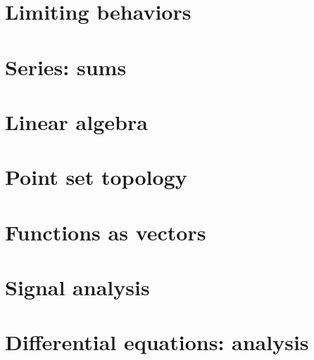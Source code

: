 \documentclass[b5paper,11pt,openleft]{memoir}
\begin{document}







\part{Limiting behaviors}






\part{Series: sums}





\part{Linear algebra}





\part{Point set topology}

% 




\part{Functions as vectors}



\part{Signal analysis}

\part{Differential equations: analysis}




%
% 
% 
% 

\backmatter

\printindex
\printbibliography
\end{document}
